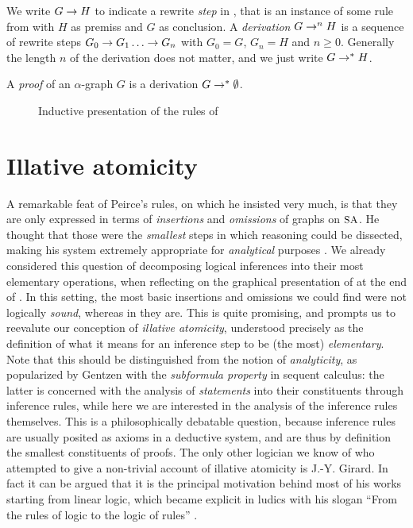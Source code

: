 \begin{definition}[Derivation]
  We write $G \rightarrow H$ to indicate a rewrite \emph{step} in , that is
  an instance of some rule from  with $H$ as premiss and $G$ as
  conclusion. A \emph{derivation} $G \rightarrow^{n} H$ is a sequence of rewrite
  steps $G_0 \rightarrow G_1 \ldots \rightarrow G_n$ with $G_0 = G$, $G_n = H$ and $n \geq
  0$. Generally the length $n$ of the derivation does not matter, and we just
  write $G \rightarrow^\ast H$.
\end{definition}

\begin{definition}[Proof]
  A \emph{proof} of an $\alpha$-graph $G$ is a derivation $G \rightarrow^\ast \emptyset$.
\end{definition}

\begin{figure}
  
  \caption{Inductive presentation of the rules of }
\end{figure}

\section{Illative atomicity}

A remarkable feat of Peirce's rules, on which he insisted very much, is that
they are only expressed in terms of \emph{insertions} and \emph{omissions} of
graphs on $\small\textsc{SA}$. He thought that those were the \emph{smallest} steps in which
reasoning could be dissected, making his system extremely appropriate for
\emph{analytical} purposes \cite[Section~7.11]{Roberts+1973}. We already
considered this question of decomposing logical inferences into their most
elementary operations, when reflecting on the graphical presentation of 
at the end of . In this setting, the most basic
insertions and omissions we could find were not logically \emph{sound}, whereas
in  they are. This is quite promising, and prompts us to reevalute
our conception of \emph{illative atomicity}, understood precisely as the
definition of what it means for an inference step to be (the most)
\emph{elementary}. Note that this should be distinguished from the notion of
\emph{analyticity}, as popularized by Gentzen with the \emph{subformula
property} in sequent calculus: the latter is concerned with the analysis of
\emph{statements} into their constituents through inference rules, while here we
are interested in the analysis of the inference rules themselves. This is a philosophically debatable question,
because inference rules are usually posited as axioms in a deductive system, and
are thus by definition the smallest constituents of proofs. The only other
logician we know of who attempted to give a non-trivial account of illative
atomicity is J.-Y. Girard. In fact it can be argued that it is the principal
motivation behind most of his works starting from linear logic, which became
explicit in ludics with his slogan ``From the rules of logic to the logic of
rules'' \cite{girard_locus_2001}.

